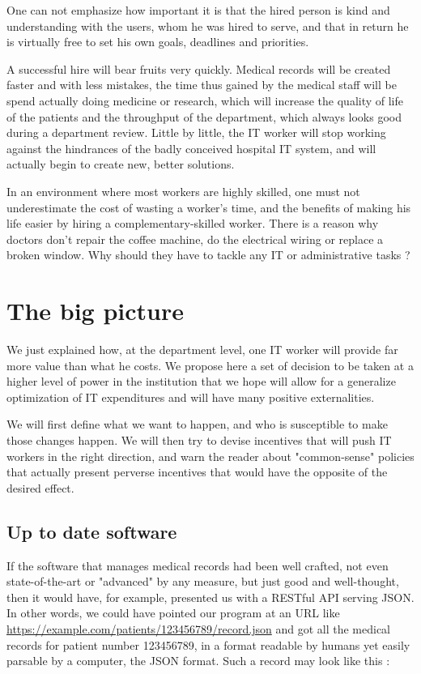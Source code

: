\documentclass[nobib]{tufte-handout}
\begin{document}
One can not emphasize how important it is that the hired person is kind and understanding with the users, whom he was hired to serve, and that in return he is virtually free to set his own goals, deadlines and priorities.

A successful hire will bear fruits very quickly. Medical records will be created faster and with less mistakes, the time thus gained by the medical staff will be spend actually doing medicine or research, which will increase the quality of life of the patients and the throughput of the department, which always looks good during a department review. Little by little, the IT worker will stop working against the hindrances of the badly conceived hospital IT system, and will actually begin to create new, better solutions.

In an environment where most workers are highly skilled, one must not underestimate the cost of wasting a worker's time, and the benefits of making his life easier by hiring a complementary-skilled worker. There is a reason why doctors don't repair the coffee machine, do the electrical wiring or replace a broken window. Why should they have to tackle any IT or administrative tasks ?


\section{The big picture}

We just explained how, at the department level, one IT worker will provide far more value than what he costs. We propose here a set of decision to be taken at a higher level of power in the institution that we hope will allow for a generalize optimization of IT expenditures and will have many positive externalities.

We will first define what we want to happen, and who is susceptible to make those changes happen. We will then try to devise incentives that will push IT workers in the right direction, and warn the reader about "common-sense" policies that actually present perverse incentives that would have the opposite of the desired effect.

\subsection{Up to date software}
\label{sec:uptodate}

If the software that manages medical records had been well crafted, not even state-of-the-art or "advanced" by any measure, but just good and well-thought, then it would have, for example, presented us with a RESTful API \cite{fielding2000architectural} serving JSON. In other words, we could have pointed our program at an URL like \url{https://example.com/patients/123456789/record.json} and got all the medical records for patient number 123456789, in a format readable by humans yet easily parsable by a computer, the JSON format. Such a record may look like this :
\end{document}
